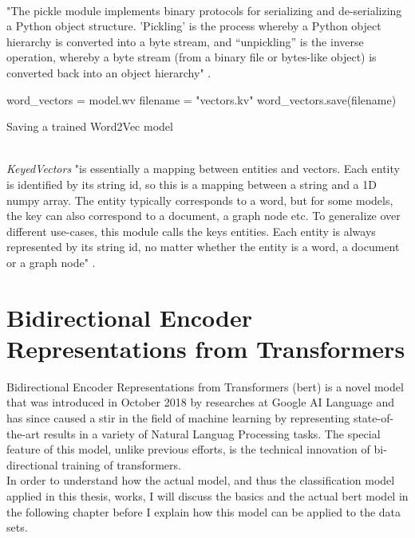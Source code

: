 \documentclass[a4paper, 11pt,titlepage,oneside,openany]{book}
\begin{document}
\\ "The pickle module implements binary protocols for serializing and de-serializing a Python object structure. 'Pickling' is the process whereby a Python object hierarchy is converted into a byte stream, and “unpickling” is the inverse operation, whereby a byte stream (from a binary file or bytes-like object) is converted back into an object hierarchy" \cite{pickle}.
\begin{algorithm}[h]
	\DontPrintSemicolon
	word\_vectors = model.wv\;
	filename = "vectors.kv"\;
	word\_vectors.save(filename)\;
	\caption{Saving a trained Word2Vec model}
\end{algorithm}
\\ \textit{KeyedVectors} "is essentially a mapping between entities and vectors. Each entity is identified by its string id, so this is a mapping between a string and a 1D numpy array. The entity typically corresponds to a word, but for some models, the key can also correspond to a document, a graph node etc. To generalize over different use-cases, this module calls the keys entities. Each entity is always represented by its string id, no matter whether the entity is a word, a document or a graph node" \cite{keyedvectors}.

\chapter{Bidirectional Encoder Representations from Transformers}
Bidirectional Encoder Representations from Transformers (\gls{bert}) \cite{bert} is a novel model that was introduced in October 2018 by researches at Google AI Language and has since caused a stir in the field of machine learning by representing state-of-the-art results in a variety of Natural Languag Processing tasks. The special feature of this model, unlike previous efforts, is the technical innovation of bi-directional training of transformers. \\
\noindent In order to understand how the actual model, and thus the classification model applied in this thesis, works, I will discuss the basics and the actual \gls{bert} model in the following chapter before I explain how this model can be applied to the data sets.
\end{document}
